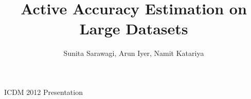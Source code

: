 \documentclass[11pt]{beamer}
\title[]{Active Accuracy Estimation on Large Datasets}
\author {Sunita Sarawagi, Arun Iyer, Namit Katariya}
\begin{document}
\begin{frame}
\titlepage
\begin{center}
\large{ICDM 2012 Presentation} \\ \vspace*{10pt}
\end{center}
\end{frame}



\end{document}

